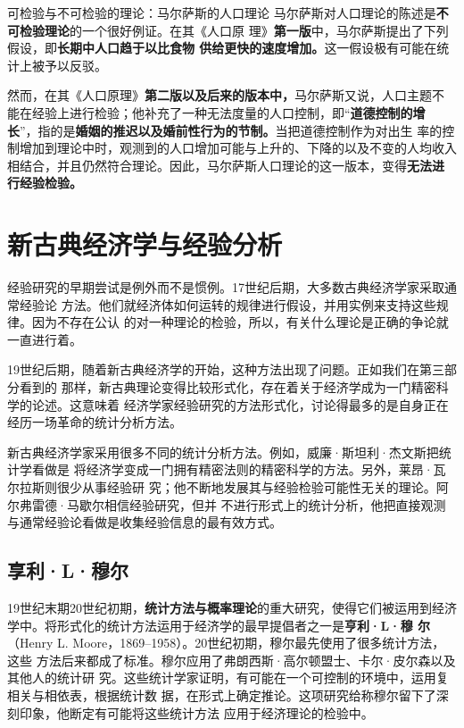 \begin{mybox}{可检验与不可检验的理论：马尔萨斯的人口理论}
  马尔萨斯对人口理论的陈述是\textbf{不可检验理论}的一个很好例证。在其《人口原
  理》\textbf{第一版}中，马尔萨斯提出了下列假设，即\textbf{长期中人口趋于以比食物
    供给更快的速度增加。}这一假设极有可能在统计上被予以反驳。

  然而，在其《人口原理》\textbf{第二版以及后来的版本中，}马尔萨斯又说，人口主题不
  能在经验上进行检验；他补充了一种无法度量的人口控制，即“\textbf{道德控制的增
    长}”，指的是\textbf{婚姻的推迟以及婚前性行为的节制。}当把道德控制作为对出生
  率的控制增加到理论中时，观测到的人口增加可能与上升的、下降的以及不变的人均收入
  相结合，并且仍然符合理论。因此，马尔萨斯人口理论的这一版本，变得\textbf{无法进
    行经验检验。}
\end{mybox}

\section{新古典经济学与经验分析}

经验研究的早期尝试是例外而不是惯例。17世纪后期，大多数古典经济学家采取通常经验论
方法。他们就经济体如何运转的规律进行假设，并用实例来支持这些规律。因为不存在公认
的对一种理论的检验，所以，有关什么理论是正确的争论就一直进行着。

19世纪后期，随着新古典经济学的开始，这种方法出现了问题。正如我们在第三部分看到的
那样，新古典理论变得比较形式化，存在着关于经济学成为一门精密科学的论述。这意味着
经济学家经验研究的方法形式化，讨论得最多的是自身正在经历一场革命的统计分析方法。

新古典经济学家采用很多不同的统计分析方法。例如，威廉·斯坦利·杰文斯把统计学看做是
将经济学变成一门拥有精密法则的精密科学的方法。另外，莱昂·瓦尔拉斯则很少从事经验研
究；他不断地发展其与经验检验可能性无关的理论。阿尔弗雷德·马歇尔相信经验研究，但并
不进行形式上的统计分析，他把直接观测与通常经验论看做是收集经验信息的最有效方式。

\subsection{享利·L·穆尔}

19世纪末期20世纪初期，\textbf{统计方法与概率理论}的重大研究，使得它们被运用到经济
学中。将形式化的统计方法运用于经济学的最早提倡者之一是\textbf{亨利·L·穆
  尔}（Henry L. Moore，1869--1958）。20世纪初期，穆尔最先使用了很多统计方法，这些
方法后来都成了标准。穆尔应用了弗朗西斯·高尔顿盟士、卡尔·皮尔森以及其他人的统计研
究。这些统计学家证明，有可能在一个可控制的环境中，运用复相关与相依表，根据统计数
据，在形式上确定推论。这项研究给称穆尔留下了深刻印象，他断定有可能将这些统计方法
应用于经济理论的检验中。

